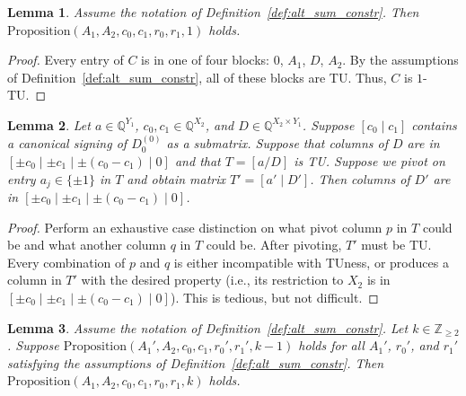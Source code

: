 \documentclass{article}
\newtheorem{lemma}{Lemma}
\theoremstyle{definition}
\begin{document}
\begin{lemma}\label{lem:alt_1_TU}
    Assume the notation of Definition~\ref{def:alt_sum_constr}. Then $\mathrm{Proposition}(A_{1}, A_{2}, c_{0}, c_{1}, r_{0}, r_{1}, 1)$ holds.
\end{lemma}

\begin{proof}
    Every entry of $C$ is in one of four blocks: $0$, $A_{1}$, $D$, $A_{2}$. By the assumptions of Definition~\ref{def:alt_sum_constr}, all of these blocks are TU. Thus, $C$ is $1$-TU.
\end{proof}

\begin{lemma}\label{lem:alt_three_sum_pivot}
    Let $a \in \mathbb{Q}^{Y_{1}}$, $c_{0}, c_{1} \in \mathbb{Q}^{X_{2}}$, and $D \in \mathbb{Q}^{X_{2} \times Y_{1}}$. Suppose $[c_{0} \mid c_{1}]$ contains a canonical signing of $D_{0}^{(0)}$ as a submatrix. Suppose that columns of $D$ are in $[\pm c_{0} \mid \pm c_{1} \mid \pm (c_{0} - c_{1}) \mid 0]$ and that $T = [a / D]$ is TU. Suppose we pivot on entry $a_{j} \in \{\pm 1\}$ in $T$ and obtain matrix $T' = [a' \mid D']$. Then columns of $D'$ are in $[\pm c_{0} \mid \pm c_{1} \mid \pm (c_{0} - c_{1}) \mid 0]$.
\end{lemma}

\begin{proof}
    Perform an exhaustive case distinction on what pivot column $p$ in $T$ could be and what another column $q$ in $T$ could be. After pivoting, $T'$ must be TU. Every combination of $p$ and $q$ is either incompatible with TUness, or produces a column in $T'$ with the desired property (i.e., its restriction to $X_{2}$ is in $[\pm c_{0} \mid \pm c_{1} \mid \pm (c_{0} - c_{1}) \mid 0]$). This is tedious, but not difficult. 
\end{proof}

\begin{lemma}\label{lem:alt_k_TU_induction}
    Assume the notation of Definition~\ref{def:alt_sum_constr}. Let $k \in \mathbb{Z}_{\geq 2}$. Suppose $\mathrm{Proposition}(A_{1}', A_{2}, c_{0}, c_{1}, r_{0}', r_{1}', k - 1)$ holds for all $A_{1}'$, $r_{0}'$, and $r_{1}'$ satisfying the assumptions of Definition~\ref{def:alt_sum_constr}. Then $\mathrm{Proposition}(A_{1}, A_{2}, c_{0}, c_{1}, r_{0}, r_{1}, k)$ holds.
\end{lemma}
\end{document}
